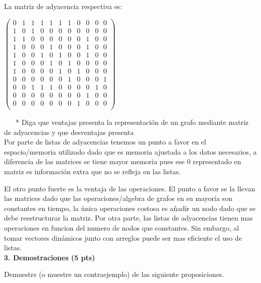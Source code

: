 \documentclass[a4paper,12pt]{article}
\begin{document}
La matriz de adyacencia respectiva es:

\begin{center}
$\begin{pmatrix}
    0 & 1 & 1 & 1 & 1 & 1 & 1 & 0 & 0 & 0 ~~~ 0 \\
    1 & 0 & 1 & 0 & 0 & 0 & 0 & 0 & 0 & 0 ~~~ 0 \\
    1 & 1 & 0 & 0 & 0 & 0 & 0 & 0 & 1 & 0 ~~~ 0 \\
    1 & 0 & 0 & 0 & 1 & 0 & 0 & 0 & 1 & 0 ~~~ 0 \\
    1 & 0 & 0 & 1 & 0 & 1 & 0 & 0 & 1 & 0 ~~~ 0 \\
    1 & 0 & 0 & 0 & 1 & 0 & 1 & 0 & 0 & 0 ~~~ 0 \\
    1 & 0 & 0 & 0 & 0 & 1 & 0 & 1 & 0 & 0 ~~~ 0 \\
    0 & 0 & 0 & 0 & 0 & 0 & 1 & 0 & 0 & 0 ~~~ 1 \\
    0 & 0 & 1 & 1 & 1 & 0 & 0 & 0 & 0 & 1 ~~~ 0 \\
    0 & 0 & 0 & 0 & 0 & 0 & 0 & 0 & 1 & 0 ~~~ 0 \\
    0 & 0 & 0 & 0 & 0 & 0 & 0 & 1 & 0 & 0 ~~~ 0 \\
\end{pmatrix}$ 
\end{center}

$ ~~~~~~ $ * Diga que ventajas presenta la representación de un grafo mediante matriz de adyacencias y que desventajas presenta \\

Por parte de listas de adyacencias tenemos un punto a favor en el espacio/memoria utilizado dado que es memoria ajustada a los datos necesarios, a diferencia de las matrices se tiene mayor memoria pues ese 0 representado en matriz es información extra que no se refleja en las listas. 

El otro punto fuerte es la ventaja de las operaciones. El punto a favor se la llevan las matrices dado que las operaciones/algebra de grafos en su mayoría son constantes en tiempo, la única operaciones costosa es añadir un nodo dado que se debe reestructurar la matriz. Por otra parte, las listas de adyacencias tienen mas operaciones en funcion del numero de nodos que constantes. Sin embargo, al tomar vectores dinámicos junto con arreglos puede ser mas eficiente el uso de listas. \\

\textbf{3. Demostraciones (5 pts)} \par
Demuestre (o muestre un contraejemplo) de las siguiente proposiciones. \\
\end{document}
